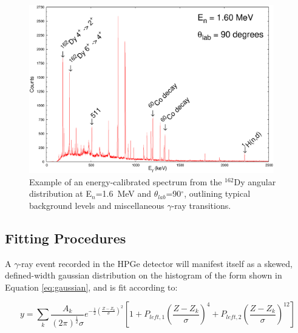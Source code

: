 \begin{figure}[h]
\begin{center}
\includegraphics[width=0.95\textwidth]{samplespec.eps}
\caption{Example of an energy-calibrated spectrum from the $^{162}$Dy angular distribution at E$_n$=1.6~MeV and $\theta_{lab}$=90$^\circ$, outlining typical background levels and miscellaneous $\gamma$-ray transitions.
\label{fig:examplespec}}
\end{center}
\end{figure}

\subsection{Fitting Procedures}\label{sec:fitting_procedures}
A $\gamma$-ray event recorded in the HPGe detector will manifest itself as a skewed, defined-width gaussian distribution on the histogram of the form shown in Equation \ref{eq:gaussian}, and is fit according to:

\begin{equation}\label{eq:gaussian}
y=\sum_k \frac{A_k}{(2\pi)^\frac{1}{2}\sigma}e^{-\frac{1}{2}\left(\frac{Z-Z_k}{\sigma}\right)^2}\left[1+P_{left,1}\left(\frac{Z-Z_k}{\sigma}\right)^4+P_{left,2}\left(\frac{Z-Z_k}{\sigma}\right)^{12}\right]
\end{equation}

